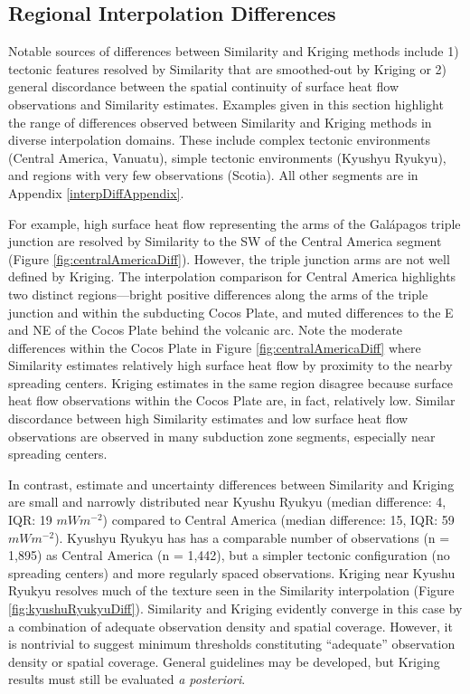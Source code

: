 \hypertarget{regionalDiff}{%
\subsection{Regional Interpolation Differences}\label{regionalDiff}}

Notable sources of differences between Similarity and Kriging methods include 1) tectonic features resolved by Similarity that are smoothed-out by Kriging or 2) general discordance between the spatial continuity of surface heat flow observations and Similarity estimates. Examples given in this section highlight the range of differences observed between Similarity and Kriging methods in diverse interpolation domains. These include complex tectonic environments (Central America, Vanuatu), simple tectonic environments (Kyushyu Ryukyu), and regions with very few observations (Scotia). All other segments are in Appendix \ref{interpDiffAppendix}.

For example, high surface heat flow representing the arms of the Galápagos triple junction are resolved by Similarity to the SW of the Central America segment (Figure \ref{fig:centralAmericaDiff}). However, the triple junction arms are not well defined by Kriging. The interpolation comparison for Central America highlights two distinct regions---bright positive differences along the arms of the triple junction and within the subducting Cocos Plate, and muted differences to the E and NE of the Cocos Plate behind the volcanic arc. Note the moderate differences within the Cocos Plate in Figure \ref{fig:centralAmericaDiff} where Similarity estimates relatively high surface heat flow by proximity to the nearby spreading centers. Kriging estimates in the same region disagree because surface heat flow observations within the Cocos Plate are, in fact, relatively low. Similar discordance between high Similarity estimates and low surface heat flow observations are observed in many subduction zone segments, especially near spreading centers.

In contrast, estimate and uncertainty differences between Similarity and Kriging are small and narrowly distributed near Kyushu Ryukyu (median difference: 4, IQR: 19 \(mWm^{-2}\)) compared to Central America (median difference: 15, IQR: 59 \(mWm^{-2}\)). Kyushyu Ryukyu has has a comparable number of observations (n = 1,895) as Central America (n = 1,442), but a simpler tectonic configuration (no spreading centers) and more regularly spaced observations. Kriging near Kyushu Ryukyu resolves much of the texture seen in the Similarity interpolation (Figure \ref{fig:kyushuRyukyuDiff}). Similarity and Kriging evidently converge in this case by a combination of adequate observation density and spatial coverage. However, it is nontrivial to suggest minimum thresholds constituting ``adequate'' observation density or spatial coverage. General guidelines may be developed, but Kriging results must still be evaluated \emph{a posteriori}.

